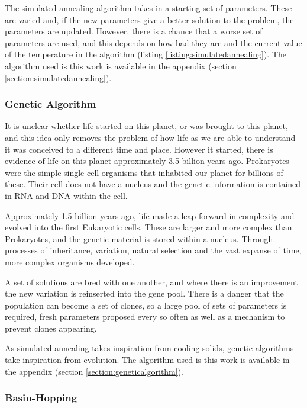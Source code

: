 The simulated annealing algorithm takes in a starting set of parameters.  These are varied and, if the new parameters give a better solution to the problem, the parameters are updated.  However, there is a chance that a worse set of parameters are used, and this depends on how bad they are and the current value of the temperature in the algorithm (listing \ref{listing:simulatedannealing}).  The algorithm used is this work is available in the appendix (section \ref{section:simulatedannealing}).


\subsubsection{Genetic Algorithm}

It is unclear whether life started on this planet, or was brought to this planet, and this idea only removes the problem of how life as we are able to understand it was conceived to a different time and place.  However it started, there is evidence of life on this planet approximately 3.5 billion years ago.  Prokaryotes were the simple single cell organisms that inhabited our planet for billions of these.  Their cell does not have a nucleus and the genetic information is contained in RNA and DNA within the cell.

Approximately 1.5 billion years ago, life made a leap forward in complexity and evolved into the first Eukaryotic cells.  These are larger and more complex than Prokaryotes, and the genetic material is stored within a nucleus.  Through processes of inheritance, variation, natural selection and the vast expanse of time, more complex organisms developed.

A set of solutions are bred with one another, and where there is an improvement the new variation is reinserted into the gene pool.  There is a danger that the population can become a set of clones, so a large pool of sets of parameters is required, fresh parameters proposed every so often as well as a mechanism to prevent clones appearing.

As simulated annealing takes inspiration from cooling solids, genetic algorithms take inspiration from evolution.  The algorithm used is this work is available in the appendix (section \ref{section:geneticalgorithm}).


\subsubsection{Basin-Hopping}

